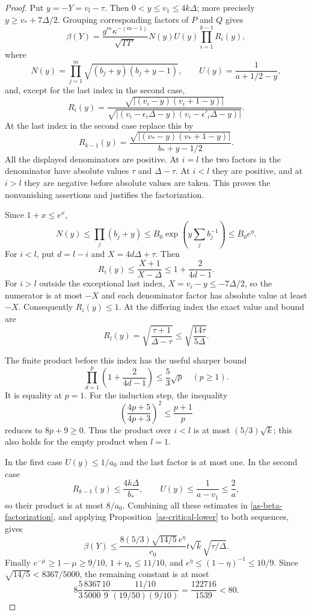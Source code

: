 \begin{proof}
Put $y=-Y=v_l-\tau$.  Then $0<y\leq v_1\leq4k\Delta$;
more precisely $y\geq v_*+7\Delta/2$.
Grouping corresponding factors of $P$ and $Q$ gives
\begin{equation}\label{as-beta-factorization}
 \beta(Y)=\frac{g^m\kappa^{-(m-1)}}{\sqrt{TT'}}
       N(y)U(y)\prod_{i=1}^{k-1}R_i(y),
\end{equation}
where
\[
 N(y)=\prod_{j=1}^m\sqrt{(b_j+y)(b_j+y-1)},\qquad
 U(y)=\frac1{a+1/2-y},
\]
and, except for the last index in the second case,
\[
 R_i(y)=
 \frac{\sqrt{|(v_i-y)(v_i+1-y)|}}
      {\sqrt{|(v_i-\epsilon_i\Delta-y)
                    (v_i-\epsilon'_i\Delta-y)|}}.
\]
At the last index in the second case replace this by
\[
 R_{k-1}(y)=
       \frac{\sqrt{|(v_*-y)(v_*+1-y)|}}{b_*+y-1/2}.
\]
All the displayed denominators are positive.  At $i=l$ the
two factors in the denominator have absolute values $\tau$
and $\Delta-\tau$.  At $i<l$ they are positive, and at
$i>l$ they are negative before absolute values are taken.
This proves the nonvanishing assertions and justifies the
factorization.

Since $1+x\leq e^x$,
\[
 N(y)\leq\prod_j(b_j+y)
       \leq B_0\exp\left(y\sum_jb_j^{-1}\right)
       \leq B_0e^\eta.
\]
For $i<l$, put $d=l-i$ and $X=4d\Delta+\tau$.
Then
\[
 R_i(y)\leq\frac{X+1}{X-\Delta}
       \leq1+\frac2{4d-1}.
\]
For $i>l$ outside the exceptional last index,
$X=v_i-y\leq-7\Delta/2$, so the numerator is at most
$-X$ and each denominator factor has absolute value at
least $-X$.  Consequently $R_i(y)\leq1$.
At the differing index the exact value and bound are
\[
 R_l(y)=\sqrt{\frac{\tau+1}{\Delta-\tau}}
              \leq\sqrt{\frac{14\tau}{5\Delta}}.
\]

The finite product before this index has the useful sharper bound
\begin{equation}\label{as-product-sqrt}
 \prod_{d=1}^p\left(1+\frac2{4d-1}\right)
                 \leq\frac53\sqrt p\quad(p\geq1).
\end{equation}
It is equality at $p=1$.  For the induction step, the inequality
\[
 \left(\frac{4p+5}{4p+3}\right)^2
                    \leq\frac{p+1}{p}
\]
reduces to $8p+9\geq0$.
Thus the product over $i<l$ is at most $(5/3)\sqrt k$;
this also holds for the empty product when $l=1$.

In the first case $U(y)\leq1/a_0$ and the last factor is
at most one.  In the second case
\[
 R_{k-1}(y)\leq\frac{4k\Delta}{b_*},\qquad
 U(y)\leq\frac1{a-v_1}\leq\frac2a,
\]
so their product is at most $8/a_0$.
Combining all these estimates in
\eqref{as-beta-factorization}, and applying
Proposition~\ref{as-critical-lower} to both sequences, gives
\[
 \beta(Y)\leq
 \frac{8(5/3)\sqrt{14/5}\,e^\eta}{c_0}
               t\sqrt k\sqrt{\tau/\Delta}.
\]
Finally $e^{-\mu}\geq1-\mu\geq9/10$,
$1+\eta_*\leq11/10$, and
$e^\eta\leq(1-\eta)^{-1}\leq10/9$.
Since $\sqrt{14/5}<8367/5000$, the remaining constant is at most
\[
 8\frac53\frac{8367}{5000}\frac{10}{9}
       \frac{11/10}{(19/50)(9/10)}
       =\frac{122716}{1539}<80.
\]
\end{proof}

